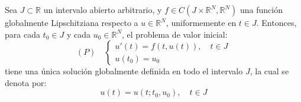 \begin{corolario}
    Sea $J \subset \mathbb{R}$ un intervalo abierto arbitrario, y $f \in C(J \times \mathbb{R}^N, \mathbb{R}^N)$ una función globalmente Lipschitziana respecto a $u \in \mathbb{R}^N$, uniformemente en $t \in J$. Entonces, para cada $t_0 \in J$ y cada $u_0 \in \mathbb{R}^N$, el problema de valor inicial:
    \[
        (P) \quad
        \begin{cases}
            u'(t) = f(t, u(t)), \quad t \in J \\
            u(t_0) = u_0
        \end{cases}
    \]
    tiene una única solución globalmente definida en todo el intervalo $J$, la cual se denota por:
    \[
        u(t) = u(t; t_0, u_0), \quad t \in J
    \]
\end{corolario}

